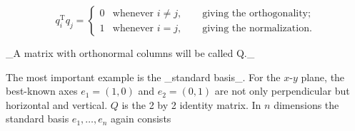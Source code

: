 \[q_{i}^{\mathrm{T}}q_{j}=\begin{cases}0&\text{whenever $i\neq j$},\qquad \text{giving the orthogonality;}\\ 1&\text{whenever $i=j$},\qquad\text{giving the normalization.}\end{cases}\]

_A matrix with orthonormal columns will be called Q._

The most important example is the _standard basis_. For the \(x\)-\(y\) plane, the best-known axes \(e_{1}=(1,0)\) and \(e_{2}=(0,1)\) are not only perpendicular but horizontal and vertical. \(Q\) is the 2 by 2 identity matrix. In \(n\) dimensions the standard basis \(e_{1},\ldots,e_{n}\) again consists
